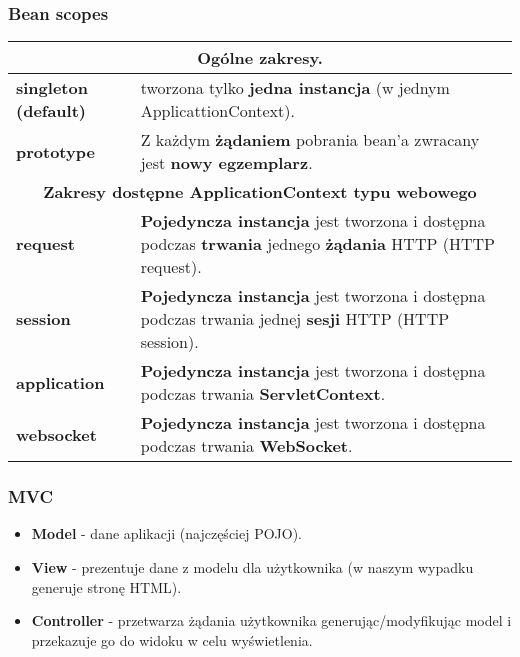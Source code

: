 \documentclass[../main.tex]{subfiles}
\begin{document}
    \subsubsection{Bean scopes}
    \begin{table}[H]
        \begin{center}
            \begin{tabular}{| p{3.5cm} | p{12.5cm} |}
                \hline
                \multicolumn{2}{|c|}{\textbf{Ogólne zakresy.}}\\
                \hline
                \textbf{singleton (default)} &
                tworzona tylko \textbf{jedna instancja} (w jednym ApplicattionContext).\\
                \hline
                \textbf{prototype} & Z każdym \textbf{żądaniem} pobrania bean'a zwracany jest
                \textbf{nowy egzemplarz}.\\
                \hline
                \hline
                \multicolumn{2}{|c|}{\textbf{Zakresy dostępne ApplicationContext typu webowego}}.\\
                \hline
                \textbf{request} & \textbf{Pojedyncza instancja} jest tworzona i dostępna podczas
                \textbf{trwania} jednego \textbf{żądania} HTTP (HTTP request).\\
                \hline
                \textbf{session} &\textbf{Pojedyncza instancja} jest tworzona i dostępna podczas
                trwania jednej \textbf{sesji} HTTP (HTTP session).\\
                \hline
                \textbf{application} & \textbf{Pojedyncza instancja} jest tworzona i dostępna podczas
                trwania \textbf{ServletContext}.\\
                \hline
                \textbf{websocket} & \textbf{Pojedyncza instancja} jest tworzona i dostępna podczas
                trwania \textbf{WebSocket}.\\
                \hline
            \end{tabular}
        \end{center}
    \end{table}

    \subsubsection{MVC}
    \begin{itemize}
        \item \textbf{Model} - dane aplikacji (najczęściej POJO).
        \item \textbf{View} - prezentuje dane z modelu dla użytkownika (w naszym wypadku generuje
        stronę HTML).
        \item \textbf{Controller} - przetwarza żądania użytkownika generując/modyfikując model i przekazuje
        go do widoku w celu wyświetlenia.
    \end{itemize}
\end{document}
